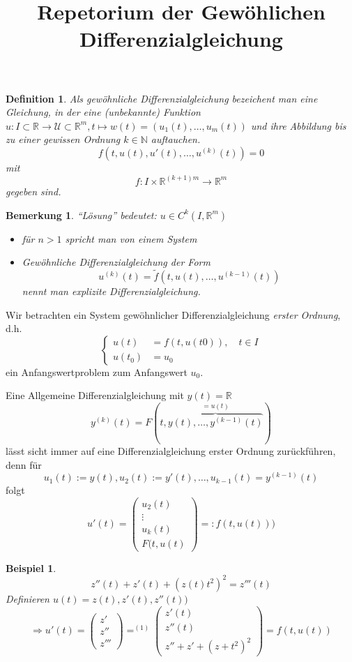 \documentclass[11pt]{article}
\title{Repetorium der Gew\"ohlichen Differenzialgleichung}
\author{}
\newcommand{\RR}{\mathbb{R}}
\newcommand{\NN}{\mathbb{N}}
\newcommand{\UU}{\mathcal{U}}
\newcounter{myCounter}[section]
\newtheorem{Def}[myCounter]{Definition}
\newtheorem{Bem}[myCounter]{Bemerkung}
\newtheorem{Bsp}[myCounter]{Beispiel}
\begin{document}
\maketitle

\begin{Def}
  Als gew\"ohnliche Differenzialgleichung bezeichent man eine Gleichung, in der eine (unbekannte)
  Funktion $u: I \subset \RR \rightarrow \UU \subset \RR^m , t \mapsto w(t)=
  (u_1(t), \dotsc, u_m(t))$ und ihre Abbildung bis zu einer gewissen Ordnung $
  k \in \NN$ auftauchen. \[
    f(t,u(t), u'(t), \dotsc, u^{(k)}(t)) = 0 \]
  mit \[
    f:I \times \RR^{(k+1)m} \rightarrow \RR^m \]
  gegeben sind.
\end{Def}

\begin{Bem}
  ``L\"osung'' bedeutet: $u\in C^k(I,\RR^m)$
  \begin{itemize}
  \item f\"ur $n > 1$ spricht man von einem System
  \item Gew\"ohnliche Differenzialgleichung der Form \[
    u^{(k)}(t) = \tilde{f}(t,u(t),\dotsc,u^{(k-1)}(t)) \]
    nennt man \emph{explizite} Differenzialgleichung.
  \end{itemize}
\end{Bem}
Wir betrachten ein System gew\"ohnlicher Differenzialgleichung \emph{erster Ordnung}, d.h.\[
  \left\{\begin{aligned} u(t) &= f(t,u(t0)), \quad t \in I \\ u(t_0) &= u_0
  \end{aligned} \right. \]
ein Anfangswertproblem zum Anfangswert $u_0$.


Eine Allgemeine Differenzialgleichung mit $y(t) = \RR$ \[
  y^{(k)}(t) = F(t,\overbrace{y(t),\dotsc,y^{(k-1)}(t)}^{=u(t)}) \]
l\"asst sicht immer auf eine Differenzialgleichung erster Ordnung zur\"uckf\"uhren, denn f\"ur
\[ u_1(t):=y(t), u_2(t) := y'(t), \dotsc, u_{k-1}(t)=y^{(k-1)}(t) \] folgt \[
  u'(t) = \begin{pmatrix} u_2(t) \\ \vdots \\ u_k(t) \\ F(t,u(t) \end{pmatrix} =
: f(t,u(t))) \]

\begin{Bsp}
\[ z''(t) + z'(t) + (z(t)t^2)^2 = z'''(t) \tag{1} \]
Definieren $u(t) = z(t), z'(t), z''(t) )$ \[
  \Rightarrow u'(t) = \begin{pmatrix} z' \\ z'' \\ z''' \end{pmatrix}  
  \mathop{=}^{(1)} \begin{pmatrix} z'(t) \\ z''(t) \\ z'' + z' + (z + t^2)^2
  \end{pmatrix} = f(t,u(t)) \]
\end{Bsp}
\end{document}
